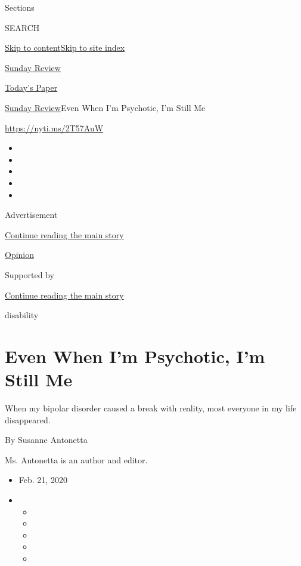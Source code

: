 Sections

SEARCH

\protect\hyperlink{site-content}{Skip to
content}\protect\hyperlink{site-index}{Skip to site index}

\href{https://www.nytimes3xbfgragh.onion/section/opinion/sunday}{Sunday
Review}

\href{https://myaccount.nytimes3xbfgragh.onion/auth/login?response_type=cookie\&client_id=vi}{}

\href{https://www.nytimes3xbfgragh.onion/section/todayspaper}{Today's
Paper}

\href{/section/opinion/sunday}{Sunday Review}\textbar{}Even When I'm
Psychotic, I'm Still Me

\url{https://nyti.ms/2T57AuW}

\begin{itemize}
\item
\item
\item
\item
\item
\end{itemize}

Advertisement

\protect\hyperlink{after-top}{Continue reading the main story}

\href{/section/opinion}{Opinion}

Supported by

\protect\hyperlink{after-sponsor}{Continue reading the main story}

disability

\hypertarget{even-when-im-psychotic-im-still-me}{%
\section{Even When I'm Psychotic, I'm Still
Me}\label{even-when-im-psychotic-im-still-me}}

When my bipolar disorder caused a break with reality, most everyone in
my life disappeared.

By Susanne Antonetta

Ms. Antonetta is an author and editor.

\begin{itemize}
\item
  Feb. 21, 2020
\item
  \begin{itemize}
  \item
  \item
  \item
  \item
  \item
  \end{itemize}
\end{itemize}


